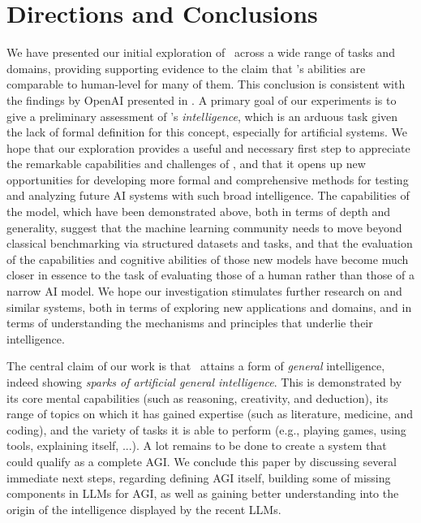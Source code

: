 \section{Directions and Conclusions}
\label{sec:conclusions}

We have presented our initial exploration of \DV\ across a wide range of tasks and domains, providing supporting evidence to the claim that \DV's abilities are comparable to human-level for many of them. This conclusion is consistent with the findings by OpenAI presented in \cite{gpt4}. A primary goal of our experiments is to give a preliminary assessment of \DV's {\em intelligence}, which is an arduous task given the lack of formal definition for this concept, especially for artificial systems. We hope that our exploration provides a useful and necessary first step to appreciate the remarkable capabilities and challenges of {\DV}, and that it opens up new opportunities for developing more formal and comprehensive methods for testing and analyzing future AI systems with such broad intelligence. The capabilities of the model, which have been demonstrated above, both in terms of depth and generality, suggest that the machine learning community needs to move beyond classical benchmarking via structured datasets and tasks, and that the evaluation of the capabilities and cognitive abilities of those new models have become much closer in essence to the task of evaluating those of a human rather than those of a narrow AI model. We hope our investigation stimulates further research on {\DV} and similar systems, both in terms of exploring new applications and domains, and in terms of understanding the mechanisms and principles that underlie their intelligence.
\newline

The central claim of our work is that \DV\ attains a form of \emph{general} intelligence, indeed showing {\em sparks of artificial general intelligence}. This is demonstrated by its core mental capabilities (such as reasoning, creativity, and deduction), its range of topics on which it has gained expertise (such as literature, medicine, and coding), and the variety of tasks it is able to perform (e.g., playing games, using tools, explaining itself, ...). A lot remains to be done to create a system that could qualify as a complete AGI. We conclude this paper by discussing several immediate next steps, regarding defining AGI itself, building some of missing components in LLMs for AGI, as well as gaining better understanding into the origin of the intelligence displayed by the recent LLMs.

